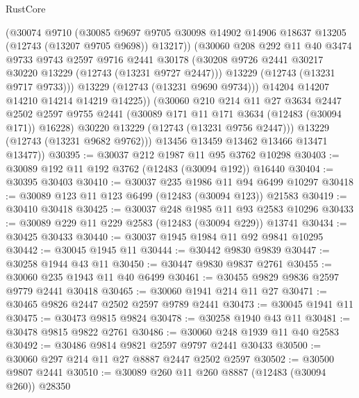\begin{lexlean}{RustCore}
\begin{coremodule}
                (@30074
                  @9710
                  (@30085
                    @9697
                    @9705
                    @30098
                    @14902
                    @14906
                    @18637
                    @13205
                    (@12743 (@13207 @9705 @9698))
                    @13217))
                (@30060
                  @208
                  @292
                  @11
                  @40
                  @3474
                  @9733
                  @9743
                  @2597
                  @9716
                  @2441
                  @30178
                  (@30208 @9726 @2441 @30217 @30220 @13229 (@12743 (@13231 @9727 @2447)))
                  @13229
                  (@12743 (@13231 @9717 @9733)))
                @13229
                (@12743 (@13231 @9690 @9734)))
              @14204
              @14207
              @14210
              @14214
              @14219
              @14225))
          (@30060
            @210
            @214
            @11
            @27
            @3634
            @2447
            @2502
            @2597
            @9755
            @2441
            (@30089 @171 @11 @171 @3634 (@12483 (@30094 @171)) @16228)
            @30220
            @13229
            (@12743 (@13231 @9756 @2447)))
          @13229
          (@12743 (@13231 @9682 @9762)))
        @13456
        @13459
        @13462
        @13466
        @13471
        @13477))
@30395 := @30037 @212 @1987 @11 @95 @3762 @10298
@30403 := @30089 @192 @11 @192 @3762 (@12483 (@30094 @192)) @16440
@30404 := @30395 @30403
@30410 := @30037 @235 @1986 @11 @94 @6499 @10297
@30418 := @30089 @123 @11 @123 @6499 (@12483 (@30094 @123)) @21583
@30419 := @30410 @30418
@30425 := @30037 @248 @1985 @11 @93 @2583 @10296
@30433 := @30089 @229 @11 @229 @2583 (@12483 (@30094 @229)) @13741
@30434 := @30425 @30433
@30440 := @30037 @1945 @1984 @11 @92 @9841 @10295
@30442 := @30045 @1945 @11
@30444 := @30442 @9830 @9839
@30447 := @30258 @1944 @43 @11
@30450 := @30447 @9830 @9837 @2761
@30455 := @30060 @235 @1943 @11 @40 @6499
@30461 := @30455 @9829 @9836 @2597 @9779 @2441 @30418
@30465 := @30060 @1941 @214 @11 @27
@30471 := @30465 @9826 @2447 @2502 @2597 @9789 @2441
@30473 := @30045 @1941 @11
@30475 := @30473 @9815 @9824
@30478 := @30258 @1940 @43 @11
@30481 := @30478 @9815 @9822 @2761
@30486 := @30060 @248 @1939 @11 @40 @2583
@30492 := @30486 @9814 @9821 @2597 @9797 @2441 @30433
@30500 := @30060 @297 @214 @11 @27 @8887 @2447 @2502 @2597
@30502 := @30500 @9807 @2441
@30510 := @30089 @260 @11 @260 @8887 (@12483 (@30094 @260)) @28350

\end{coremodule}
\end{lexlean}
